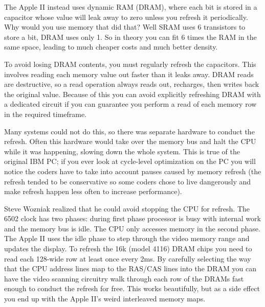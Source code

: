 The Apple II instead uses dynamic RAM (DRAM), where each bit is stored in
a capacitor whose value will leak away to zero unless you
refresh it periodically.
Why would you use memory that did that?
Well SRAM uses 6 transistors to store a bit, DRAM uses only 1.
So in theory you can fit 6 times the RAM in the same space, leading
to much cheaper costs and much better density.

To avoid losing DRAM contents, you must regularly refresh the capacitors.
This involves reading each memory value out faster
than it leaks away.
DRAM reads are destructive,
so a read operation always reads out, recharges, then writes back
the original value.
Because of this you can avoid explicitly refreshing DRAM with a dedicated
circuit if you can guarantee you perform a read of each memory row
in the required timeframe.

Many systems could not do this, so there was separate
hardware to conduct the refresh.
Often this hardware would take over the memory bus and halt the CPU
while it was happening, slowing down the whole system.
This is true of the original IBM PC;
if you ever look at cycle-level optimization on the PC
you will notice the coders have to take into account pauses caused by
memory refresh (the refresh tended to be conservative so some coders
chose to live dangerously and make refresh happen less often to increase
performance).


Steve Wozniak realized that he could avoid stopping the CPU for refresh.
The 6502 clock has two phases:
during first phase processor is busy
with internal work and the memory bus is idle.
The CPU only accesses memory in the second phase.
The Apple II uses the idle phase to step through the video memory
range and updates the display.
To refresh the 16k (model 4116) DRAM chips you need to read each 128-wide
row at least once every 2ms.
By carefully selecting the way that the CPU address lines map to
the RAS/CAS lines into the DRAM you can have the video scanning
circuitry walk through each row of the DRAMs fast enough to
conduct the refresh for free. 
This works beautifully, but as a side effect you end up with the Apple II's
weird interleaved memory maps.

